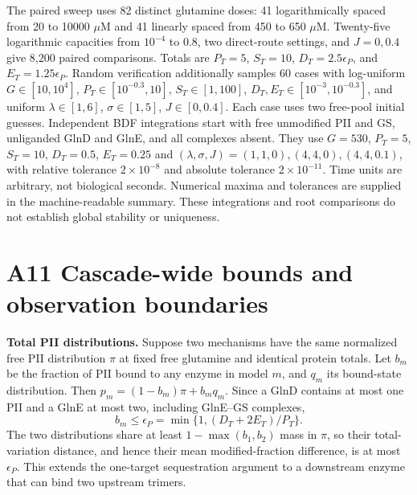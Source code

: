 \documentclass[11pt]{article}
\begin{document}
The paired sweep uses 82 distinct glutamine doses: 41 logarithmically spaced from 20 to 10000 $\mu$M and 41 linearly spaced from 450 to 650 $\mu$M. Twenty-five logarithmic capacities from $10^{-4}$ to 0.8, two direct-route settings, and $J=0,0.4$ give 8,200 paired comparisons. Totals are $P_T=5$, $S_T=10$, $D_T=2.5\epsilon_P$, and $E_T=1.25\epsilon_P$. Random verification additionally samples 60 cases with log-uniform $G\in[10,10^4]$, $P_T\in[10^{-0.3},10]$, $S_T\in[1,100]$, $D_T,E_T\in[10^{-3},10^{-0.3}]$, and uniform $\lambda\in[1,6]$, $\sigma\in[1,5]$, $J\in[0,0.4]$. Each case uses two free-pool initial guesses. Independent BDF integrations start with free unmodified PII and GS, unliganded GlnD and GlnE, and all complexes absent. They use $G=530$, $P_T=5$, $S_T=10$, $D_T=0.5$, $E_T=0.25$ and $(\lambda,\sigma,J)=(1,1,0),(4,4,0),(4,4,0.1)$, with relative tolerance $2\times10^{-8}$ and absolute tolerance $2\times10^{-11}$. Time units are arbitrary, not biological seconds. Numerical maxima and tolerances are supplied in the machine-readable summary. These integrations and root comparisons do not establish global stability or uniqueness.

\section*{A11 Cascade-wide bounds and observation boundaries}

\textbf{Total PII distributions.} Suppose two mechanisms have the same normalized free PII distribution $\pi$ at fixed free glutamine and identical protein totals. Let $b_m$ be the fraction of PII bound to any enzyme in model $m$, and $q_m$ its bound-state distribution. Then $p_m=(1-b_m)\pi+b_mq_m$. Since a GlnD contains at most one PII and a GlnE at most two, including GlnE--GS complexes,
\[
 b_m\leq \epsilon_P=\min\{1,(D_T+2E_T)/P_T\}.
\]
The two distributions share at least $1-\max(b_1,b_2)$ mass in $\pi$, so their total-variation distance, and hence their mean modified-fraction difference, is at most $\epsilon_P$. This extends the one-target sequestration argument to a downstream enzyme that can bind two upstream trimers.
\end{document}
